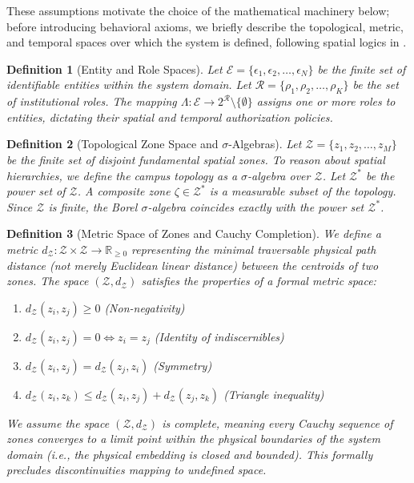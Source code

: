 \documentclass[conference]{IEEEtran}
\newtheorem{definition}{Definition}
\newcommand{\E}{\mathcal{E}} %
\newcommand{\Z}{\mathcal{Z}} %
\newcommand{\Roles}{\mathcal{R}} %
\begin{document}
These assumptions motivate the choice of the mathematical machinery below; before introducing behavioral axioms, we briefly describe the topological, metric, and temporal spaces over which the system is defined, following spatial logics in \cite{b16}.

\begin{definition}[Entity and Role Spaces]
Let $\E = \{ \epsilon_1, \epsilon_2, \dots, \epsilon_N \}$ be the finite set of identifiable entities within the system domain. Let $\Roles = \{ \rho_1, \rho_2, \dots, \rho_K \}$ be the set of institutional roles. The mapping $\Lambda: \E \to 2^\Roles \setminus \{\emptyset\}$ assigns one or more roles to entities, dictating their spatial and temporal authorization policies.
\end{definition}

\begin{definition}[Topological Zone Space and $\sigma$-Algebras]
Let $\Z = \{ z_1, z_2, \dots, z_M \}$ be the finite set of disjoint fundamental spatial zones. To reason about spatial hierarchies, we define the campus topology as a $\sigma$-algebra over $\Z$. Let $\Z^*$ be the power set of $\Z$. A composite zone $\zeta \in \Z^*$ is a measurable subset of the topology. Since $\Z$ is finite, the Borel $\sigma$-algebra coincides exactly with the power set $\Z^*$.
\end{definition}

\begin{definition}[Metric Space of Zones and Cauchy Completion]
We define a metric $d_\Z: \Z \times \Z \to \mathbb{R}_{\ge 0}$ representing the minimal traversable physical path distance (not merely Euclidean linear distance) between the centroids of two zones. The space $(\Z, d_\Z)$ satisfies the properties of a formal metric space:
\begin{enumerate}
    \item $d_\Z(z_i, z_j) \ge 0$ (Non-negativity)
    \item $d_\Z(z_i, z_j) = 0 \iff z_i = z_j$ (Identity of indiscernibles)
    \item $d_\Z(z_i, z_j) = d_\Z(z_j, z_i)$ (Symmetry)
    \item $d_\Z(z_i, z_k) \le d_\Z(z_i, z_j) + d_\Z(z_j, z_k)$ (Triangle inequality)
\end{enumerate}
We assume the space $(\Z, d_\Z)$ is complete, meaning every Cauchy sequence of zones converges to a limit point within the physical boundaries of the system domain (i.e., the physical embedding is closed and bounded). This formally precludes discontinuities mapping to undefined space.
\end{definition}
\end{document}

